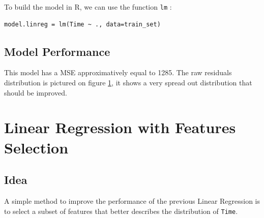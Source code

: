\documentclass[]{report}
\newcommand{\inputtikz}[2]{%
	\scalebox{#1}{}  
}
\begin{document}
To build the model in R, we can use the function \texttt{lm} :
\begin{lstlisting}
model.linreg = lm(Time ~ ., data=train_set)
\end{lstlisting}

\subsection{Model Performance}
This model has a MSE approximatively equal to 1285. The raw residuals distribution is pictured on figure \ref{fig:linreg_hist}, it shows a very spread out distribution that should be improved.

\begin{figure}[!h]
	\centering
	\inputtikz{0.5}{Figures/linreg_hist.tex}
	\caption{}
	\label{fig:linreg_hist}
\end{figure}

\begin{figure}[!h]
	\centering
	\inputtikz{0.5}{Figures/linreg_predicted.tex}
	\caption{}
	\label{fig:linreg_predicted}
\end{figure}

\section{Linear Regression with Features Selection}
\subsection{Idea}
A simple method to improve the performance of the previous Linear Regression is to select a subset of features that better describes the distribution of \texttt{Time}.
\end{document}
